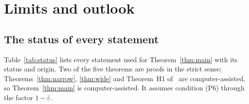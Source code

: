 \section{Limits and outlook}
\label{sec:limits}

\subsection{The status of every statement}

Table~\ref{tab:status} lists every statement used for Theorem~\ref{thm:main} with its status and origin.
Two of the five theorems are proofs in the strict sense; Theorems~\ref{thm:narrow}, \ref{thm:wide} and Theorem~H1 of~\cite{H} are computer-assisted, so Theorem~\ref{thm:main} is computer-assisted.
It assumes condition (P6) through the factor $1-\bar\varepsilon$.

